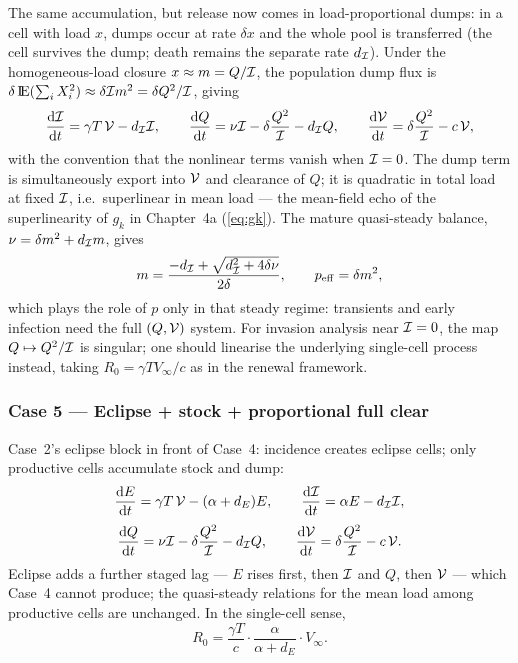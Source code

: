 The same accumulation, but release now comes in load-proportional dumps: in
a cell with load $x$, dumps occur at rate $\delta x$ and the whole pool is
transferred (the cell survives the dump; death remains the separate rate
$d_{\mathcal{I}}$). Under the homogeneous-load closure $x\approx m=Q/\mathcal{I}$,
the population dump flux is $\delta\,{\rm I}\!{\rm E}(\sum_i X_i^2)\approx
\delta\mathcal{I} m^2=\delta Q^2/\mathcal{I}$, giving
\begin{equation}
\displaystyle\frac{{\rm d} \mathcal{I}}{{\rm d} t}=\gamma T\,\mathcal{V}-d_{\mathcal{I}}\mathcal{I},
\qquad
\displaystyle\frac{{\rm d} Q}{{\rm d} t}=\nu\mathcal{I}-\delta\frac{Q^2}{\mathcal{I}}-d_{\mathcal{I}}Q,
\qquad
\displaystyle\frac{{\rm d} \mathcal{V}}{{\rm d} t}=\delta\frac{Q^2}{\mathcal{I}}-c\,\mathcal{V},
\end{equation}
with the convention that the nonlinear terms vanish when $\mathcal{I}=0$. The
dump term is simultaneously export into $\mathcal{V}$ and clearance of $Q$; it
is quadratic in total load at fixed $\mathcal{I}$, i.e.\ superlinear in mean
load --- the mean-field echo of the superlinearity of $g_k$ in
Chapter~4a (\eqref{eq:gk}). The mature quasi-steady balance,
$\nu=\delta m^2+d_{\mathcal{I}}m$, gives
\begin{equation}
m=\frac{-d_{\mathcal{I}}+\sqrt{d_{\mathcal{I}}^2+4\delta\nu}}{2\delta},
\qquad
p_{\mathrm{eff}}=\delta m^2,
\end{equation}
which plays the role of $p$ only in that steady regime: transients and
early infection need the full $(Q,\mathcal{V})$ system. For invasion analysis
near $\mathcal{I}=0$, the map $Q\mapsto Q^2/\mathcal{I}$ is singular; one should
linearise the underlying single-cell process instead, taking
$R_0=\gamma T V_\infty/c$ as in the renewal framework.

\subsubsection{Case 5 --- Eclipse + stock + proportional full clear}

Case~2's eclipse block in front of Case~4: incidence creates eclipse cells;
only productive cells accumulate stock and dump:
\begin{equation}
\displaystyle\frac{{\rm d} E}{{\rm d} t}=\gamma T\,\mathcal{V}-(\alpha+d_E)E,
\qquad
\displaystyle\frac{{\rm d} \mathcal{I}}{{\rm d} t}=\alpha E-d_{\mathcal{I}}\mathcal{I},
\end{equation}
\begin{equation}
\displaystyle\frac{{\rm d} Q}{{\rm d} t}=\nu\mathcal{I}-\delta\frac{Q^2}{\mathcal{I}}-d_{\mathcal{I}}Q,
\qquad
\displaystyle\frac{{\rm d} \mathcal{V}}{{\rm d} t}=\delta\frac{Q^2}{\mathcal{I}}-c\,\mathcal{V}.
\end{equation}
Eclipse adds a further staged lag --- $E$ rises first, then $\mathcal{I}$ and
$Q$, then $\mathcal{V}$ --- which Case~4 cannot produce; the quasi-steady
relations for the mean load among productive cells are unchanged. In the
single-cell sense,
\begin{equation}
R_0=\frac{\gamma T}{c}\cdot\frac{\alpha}{\alpha+d_E}\cdot V_\infty.
\end{equation}

